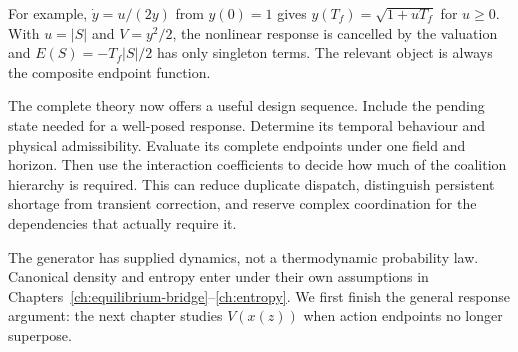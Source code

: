 For example, $\dot y=u/(2y)$ from $y(0)=1$ gives $y(T_f)=\sqrt{1+uT_f}$ for $u\geq0$. With $u=|S|$ and $V=y^2/2$, the nonlinear response is cancelled by the valuation and $E(S)=-T_f|S|/2$ has only singleton terms. The relevant object is always the composite endpoint function.

The complete theory now offers a useful design sequence. Include the pending state needed for a well-posed response. Determine its temporal behaviour and physical admissibility. Evaluate its complete endpoints under one field and horizon. Then use the interaction coefficients to decide how much of the coalition hierarchy is required. This can reduce duplicate dispatch, distinguish persistent shortage from transient correction, and reserve complex coordination for the dependencies that actually require it.

The generator has supplied dynamics, not a thermodynamic probability law. Canonical density and entropy enter under their own assumptions in Chapters~\ref{ch:equilibrium-bridge}--\ref{ch:entropy}. We first finish the general response argument: the next chapter studies $V(x(z))$ when action endpoints no longer superpose.
